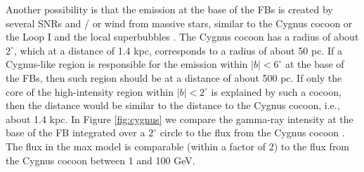 Another possibility is that the emission at the base of the FBs is created by several SNRs and / or wind from
massive stars, similar to the Cygnus cocoon \citep{2011Sci...334.1103A} or the Loop I and the local superbubbles 
\citep{2001ApJS..134..283S, 2006A&A...452L...1B, Wolleben:2007pq, 2016Natur.532...73B, 2018Galax...6...26S, 2018Galax...6...56D, 2018Galax...6...62S}.
The Cygnus cocoon \citep{2011Sci...334.1103A} has a radius of about $2^\circ$, 
which at a distance of 1.4 kpc, corresponds to a radius of about 50 pc.
If a Cygnus-like region is responsible for the emission within $|b| < 6^\circ$ at the base of the FBs,
then such region should be at a distance of about 500 pc.
If only the core of the high-intensity region within $|b| < 2^\circ$ is explained by such a cocoon,
then the distance would be similar to the distance to the Cygnus cocoon, i.e., about 1.4 kpc.
In Figure \ref{fig:cygnus} we compare the gamma-ray intensity at the base of the FB integrated over a $2^\circ$ circle
to the flux from the Cygnus cocoon
\citep{2007ApJ...664L..91A, 2011Sci...334.1103A}.
The flux in the max model is comparable (within a factor of 2) 
to the flux from the Cygnus cocoon between 1 and 100 GeV.

